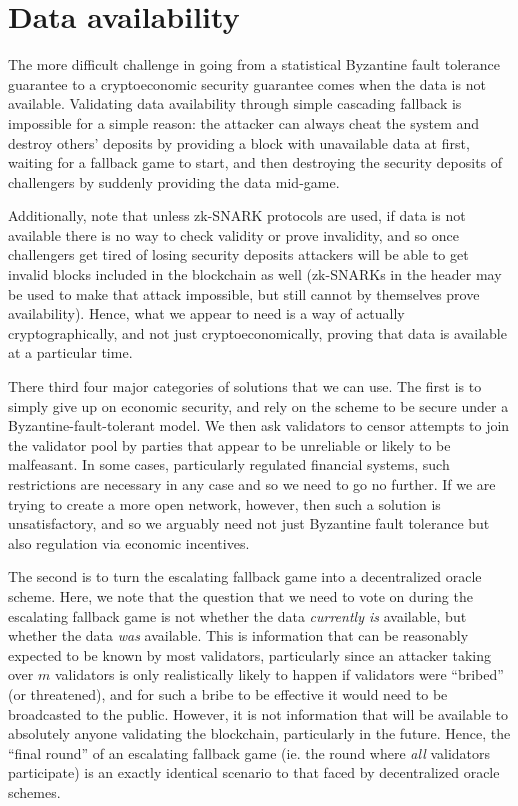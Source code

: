 \documentclass[11pt,a4paper]{report}
\theoremstyle{plain}
\theoremstyle{definition}
\theoremstyle{remark}
\begin{document}
\chapter{Data availability}

The more difficult challenge in going from a statistical Byzantine fault tolerance guarantee to a cryptoeconomic security guarantee comes when the data is not available. Validating data availability through simple cascading fallback is impossible for a simple reason: the attacker can always cheat the system and destroy others' deposits by providing a block with unavailable data at first, waiting for a fallback game to start, and then destroying the security deposits of challengers by suddenly providing the data mid-game.

Additionally, note that unless zk-SNARK protocols are used, if data is not available there is no way to check validity or prove invalidity, and so once challengers get tired of losing security deposits attackers will be able to get invalid blocks included in the blockchain as well (zk-SNARKs in the header may be used to make that attack impossible, but still cannot by themselves prove availability). Hence, what we appear to need is a way of actually cryptographically, and not just cryptoeconomically, proving that data is available at a particular time.

There third four major categories of solutions that we can use. The first is to simply give up on economic security, and rely on the scheme to be secure under a Byzantine-fault-tolerant model. We then ask validators to censor attempts to join the validator pool by parties that appear to be unreliable or likely to be malfeasant. In some cases, particularly regulated financial systems, such restrictions are necessary in any case and so we need to go no further. If we are trying to create a more open network, however, then such a solution is unsatisfactory, and so we arguably need not just Byzantine fault tolerance but also regulation via economic incentives.

The second is to turn the escalating fallback game into a decentralized oracle scheme. Here, we note that the question that we need to vote on during the escalating fallback game is not whether the data \emph{currently is} available, but whether the data \emph{was} available. This is information that can be reasonably expected to be known by most validators, particularly since an attacker taking over $m$ validators is only realistically likely to happen if validators were ``bribed'' (or threatened), and for such a bribe to be effective it would need to be broadcasted to the public. However, it is not information that will be available to absolutely anyone validating the blockchain, particularly in the future. Hence, the ``final round'' of an escalating fallback game (ie. the round where \emph{all} validators participate) is an exactly identical scenario to that faced by decentralized oracle schemes.
\end{document}
